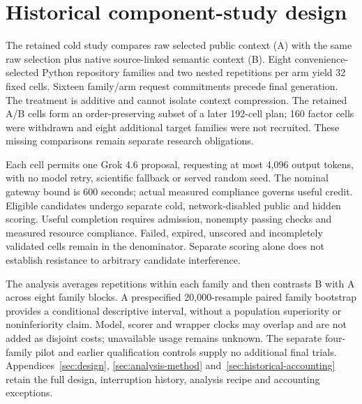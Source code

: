 \section{Historical component-study design}
\label{sec:historical-design-summary}

The retained cold study compares raw selected public context (A) with the same
raw selection plus native source-linked semantic context (B). Eight
convenience-selected Python repository families and two nested repetitions per
arm yield 32 fixed cells. Sixteen family/arm request commitments precede final
generation. The treatment is additive and cannot isolate context compression.
The retained A/B cells form an order-preserving subset of a later 192-cell plan;
160 factor cells were withdrawn and eight additional target families were not
recruited. These missing comparisons remain separate research obligations.

Each cell permits one Grok 4.6 proposal, requesting at most 4,096 output tokens,
with no model retry, scientific fallback or served random seed. The nominal
gateway bound is 600 seconds; actual measured compliance governs useful credit.
Eligible candidates undergo separate cold, network-disabled public and hidden
scoring. Useful completion requires admission, nonempty passing checks and
measured resource compliance. Failed, expired, unscored and incompletely
validated cells remain in the denominator. Separate scoring alone does not
establish resistance to arbitrary candidate interference.

The analysis averages repetitions within each family and then contrasts B with
A across eight family blocks. A prespecified 20,000-resample paired family
bootstrap provides a conditional descriptive interval, without a population
superiority or noninferiority claim. Model, scorer and wrapper clocks may
overlap and are not added as disjoint costs; unavailable usage remains unknown.
The separate four-family pilot and earlier qualification controls supply no
additional final trials. Appendices~\ref{sec:design},
\ref{sec:analysis-method} and~\ref{sec:historical-accounting} retain the full
design, interruption history, analysis recipe and accounting exceptions.

